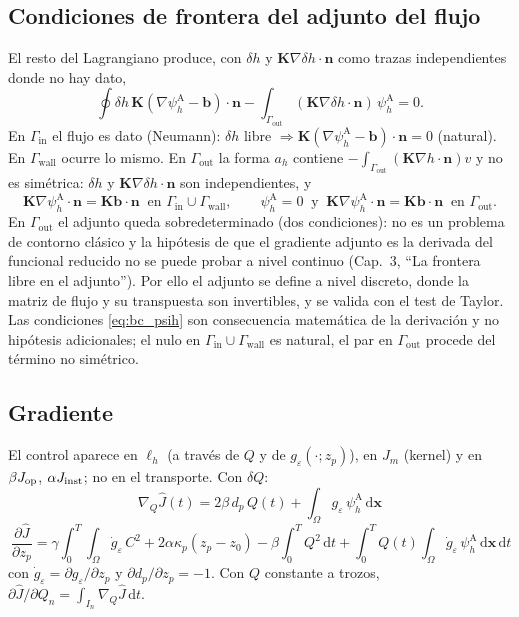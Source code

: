 \documentclass[11pt]{article}
\numberwithin{equation}{section}
\theoremstyle{remark}
\newcommand{\bK}{\mathbf{K}}
\newcommand{\bn}{\mathbf{n}}
\newcommand{\bb}{\mathbf{b}}
\newcommand{\bx}{\mathbf{x}}
\newcommand{\geps}{g_\varepsilon}
\newcommand{\ph}[1]{\psi_h^{\mathrm{#1}}}  %
\newcommand{\dd}{\,\mathrm{d}}
\newcommand{\Gin}{\Gamma_{\mathrm{in}}}
\newcommand{\Gout}{\Gamma_{\mathrm{out}}}
\newcommand{\Gwall}{\Gamma_{\mathrm{wall}}}
\begin{document}
\subsection{Condiciones de frontera del adjunto del flujo}
El resto del Lagrangiano produce, con $\delta h$ y $\bK\nabla\delta h\cdot\bn$ como trazas independientes donde no hay dato,
\[
\oint\delta h\,\bK(\nabla\ph{A}-\bb)\cdot\bn-\int_{\Gout}(\bK\nabla\delta h\cdot\bn)\,\ph{A}=0 .
\]
En $\Gin$ el flujo es dato (Neumann): $\delta h$ libre $\Rightarrow\bK(\nabla\ph{A}-\bb)\cdot\bn=0$ (natural). En $\Gwall$ ocurre lo mismo. En $\Gout$ la forma $a_h$ contiene $-\int_{\Gout}(\bK\nabla h\cdot\bn)v$ y no es sim\'etrica:
$\delta h$ y $\bK\nabla\delta h\cdot\bn$ son independientes, y
\begin{equation}
\bK\nabla\ph{A}\cdot\bn=\bK\bb\cdot\bn\ \text{ en }\Gin\cup\Gwall,\qquad
\ph{A}=0\ \text{ y }\ \bK\nabla\ph{A}\cdot\bn=\bK\bb\cdot\bn\ \text{ en }\Gout .
\label{eq:bc_psih}
\end{equation}
En $\Gout$ el adjunto queda sobredeterminado (dos condiciones): no es un problema de contorno cl\'asico y la hip\'otesis de que el gradiente adjunto es la derivada del funcional reducido no se puede probar a nivel continuo
(Cap.~3, ``La frontera libre en el adjunto''). Por ello el adjunto se define a nivel discreto, donde la matriz de flujo y su transpuesta son invertibles, y se valida con el test de Taylor. Las condiciones \eqref{eq:bc_psih}
son consecuencia matem\'atica de la derivaci\'on y no hip\'otesis adicionales; el nulo en $\Gin\cup\Gwall$ es natural, el par en $\Gout$ procede del t\'ermino no sim\'etrico.

\subsection{Gradiente}
El control aparece en $\ell_h$ (a trav\'es de $Q$ y de $\geps(\cdot;z_p)$), en $J_m$ (kernel) y en $\beta J_{\rm op}$, $\alpha J_{\rm inst}$; no en el transporte. Con $\delta Q$:
\begin{equation}
\boxed{\ \nabla_Q\hat J(t)=2\beta\,d_p\,Q(t)+\int_\Omega\geps\,\ph{A}\dd\bx\ }
\label{eq:grad_Q}
\end{equation}
\begin{equation}
\boxed{\ \frac{\partial\hat J}{\partial z_p}=\gamma\!\int_0^T\!\!\!\int_\Omega\dot g_\varepsilon\,C^2+2\alpha\kappa_p(z_p-z_0)-\beta\!\int_0^TQ^2\dd t+\int_0^T\!\!Q(t)\!\int_\Omega\dot g_\varepsilon\,\ph{A}\dd\bx\dd t\ }
\label{eq:grad_z}
\end{equation}
con $\dot g_\varepsilon=\partial\geps/\partial z_p$ y $\partial d_p/\partial z_p=-1$. Con $Q$ constante a trozos, $\partial\hat J/\partial Q_n=\int_{I_n}\nabla_Q\hat J\dd t$.
\end{document}
